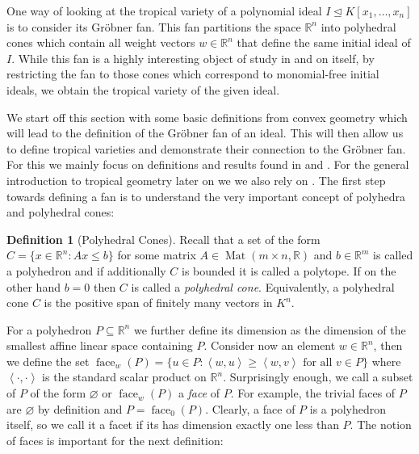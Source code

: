 \documentclass[
  paper=a4,
  DIV=14,
  fontsize=12pt,
  titlepage,
  bibliography=totoc,
  pagesize=pdftex
]{scrartcl}
\numberwithin{figure}{section}
\numberwithin{equation}{section}
\numberwithin{table}{section}
\newcommand*\setR{\mathds{R}}
\newcommand*\ideal[1]{\left\langle #1 \right\rangle}
\let\idealof\trianglelefteq
\DeclareMathOperator{\Mat}{Mat}
\DeclareMathOperator{\face}{face}
\theoremstyle{definition}
\newtheorem{definition}{Definition}
\numberwithin{definition}{section}
\begin{document}
One way of looking at the tropical variety of a polynomial ideal $I \idealof K[x_1, \dots,
x_n]$ is to consider its Gröbner fan. This fan partitions the space $\setR^n$ into
polyhedral cones which contain all weight vectors $w\in \setR^n$ that define the same
initial ideal of $I$. While this fan is a highly interesting object of study in and on
itself, by restricting the fan to those cones which correspond to monomial-free initial
ideals, we obtain the tropical variety of the given ideal.

We start off this section with some basic definitions from convex geometry which will lead
to the definition of the Gröbner fan of an ideal. This will then allow us to define
tropical varieties and demonstrate their connection to the Gröbner fan. For this we mainly
focus on definitions and results found in \cite{compGrobFan} and \cite{SturmGBCP}. For the
general introduction to tropical geometry later on we we also rely on
\cite{sturmMacTrop}. The first step towards defining a fan is to understand the very
important concept of polyhedra and polyhedral cones:

\begin{definition}[Polyhedral Cones]
  Recall that a set of the form $C = \{ x \in \setR^n : Ax \leq b \}$ for some matrix $A
  \in \Mat(m\times n, \setR)$ and $b \in \setR^m$ is called a polyhedron and if
  additionally $C$ is bounded it is called a polytope. If on the other hand $b=0$ then $C$
  is called a \emph{polyhedral cone}. Equivalently, a polyhedral cone $C$ is the positive
  span of finitely many vectors in $K^n$.
  \label{def:polyhedralCone}
\end{definition}

For a polyhedron $P \subseteq \setR^n$ we further define its dimension as the dimension of
the smallest affine linear space containing $P$. Consider now an element $w \in \setR^n$,
then we define the set $\face_w(P) = \{ u \in P : \ideal{w,u} \geq \ideal{w,v} \text{ for
all } v\in P\}$ where $\ideal{\cdot,\cdot}$ is the standard scalar product on $\setR^n$.
Surprisingly enough, we call a subset of $P$ of the form $\varnothing$ or $\face_w(P)$ a
\emph{face} of $P$. For example, the trivial faces of $P$ are $\varnothing$ by definition
and $P = \face_0(P)$. Clearly, a face of $P$ is a polyhedron itself, so we call it a facet
if its has dimension exactly one less than $P$. The notion of faces is important for the
next definition:
\end{document}
